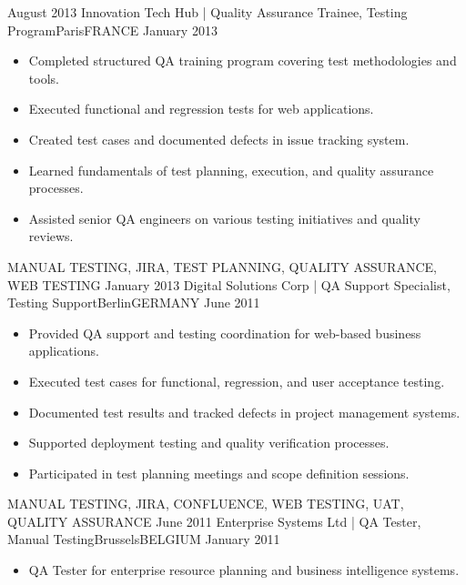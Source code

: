 \begin{experiences}
    {August 2013}     {Innovation Tech Hub | Quality Assurance Trainee, Testing Program}{Paris}{FRANCE}
    {January 2013}    {
                      \begin{itemize}
                        \item Completed structured QA training program covering test methodologies and tools.
                        \item Executed functional and regression tests for web applications.
                        \item Created test cases and documented defects in issue tracking system.
                        \item Learned fundamentals of test planning, execution, and quality assurance processes.
                        \item Assisted senior QA engineers on various testing initiatives and quality reviews.
                      \end{itemize}
                    }
                    {MANUAL TESTING, JIRA, TEST PLANNING, QUALITY ASSURANCE, WEB TESTING}
  \emptySeparator
  \experience
    {January 2013}     {Digital Solutions Corp | QA Support Specialist, Testing Support}{Berlin}{GERMANY}
    {June 2011}    {
                      \begin{itemize}
                        \item Provided QA support and testing coordination for web-based business applications.
                        \item Executed test cases for functional, regression, and user acceptance testing.
                        \item Documented test results and tracked defects in project management systems.
                        \item Supported deployment testing and quality verification processes.
                        \item Participated in test planning meetings and scope definition sessions.
                      \end{itemize}
                    }
                    {MANUAL TESTING, JIRA, CONFLUENCE, WEB TESTING, UAT, QUALITY ASSURANCE}
  \emptySeparator
  \experience
    {June 2011}     {Enterprise Systems Ltd | QA Tester, Manual Testing}{Brussels}{BELGIUM}
    {January 2011}    {
                      \begin{itemize}
                        \item QA Tester for enterprise resource planning and business intelligence systems.

\end{itemize}}
\end{experiences}
